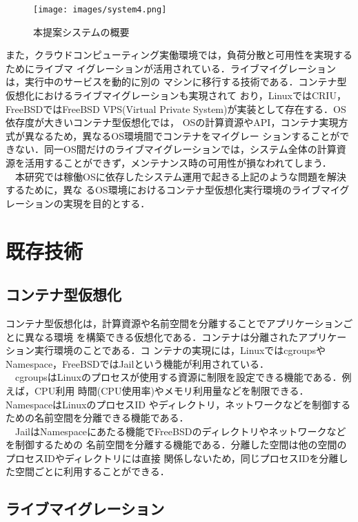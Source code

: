 \documentclass[11pt]{jarticle}
\begin{document}
\begin{figure*}[t]
  \centering
  \texttt{[image: images/system4.png]} \\
  \caption{本提案システムの概要}
  \label{fig:system}
\end{figure*}

また，クラウドコンピューティング実働環境では，負荷分散と可用性を実現するためにライブマ
イグレーションが活用されている．ライブマイグレーションは，実行中のサービスを動的に別の
マシンに移行する技術である．コンテナ型仮想化におけるライブマイグレーションも実現されて
おり，LinuxではCRIU\cite{criu}，FreeBSDではFreeBSD VPS(Virtual Private
 System)\cite{freebsd-vps}が実装として存在する．OS依存度が大きいコンテナ型仮想化では，
 OSの計算資源やAPI，コンテナ実現方式が異なるため，異なるOS環境間でコンテナをマイグレー
 ションすることができない．同一OS間だけのライブマイグレーションでは，システム全体の計算資
 源を活用することができず，メンテナンス時の可用性が損なわれてしまう．\\
　本研究では稼働OSに依存したシステム運用で起きる上記のような問題を解決するために，異な
るOS環境におけるコンテナ型仮想化実行環境のライブマイグレーションの実現を目的とする．

\section{既存技術}
\subsection{コンテナ型仮想化}
\label{sec:container}

コンテナ型仮想化は，計算資源や名前空間を分離することでアプリケーションごとに異なる環境
を構築できる仮想化である．コンテナは分離されたアプリケーション実行環境のことである．コ
ンテナの実現には，LinuxではcgroupsやNamespace，FreeBSDではJailという機能が利用されている．\\
　cgroupsはLinuxのプロセスが使用する資源に制限を設定できる機能である．例えば，CPU利用
時間(CPU使用率)やメモリ利用量などを制限できる．NamespaceはLinuxのプロセスID
やディレクトリ，ネットワークなどを制御するための名前空間を分離できる機能である．\\
　JailはNamespaceにあたる機能でFreeBSDのディレクトリやネットワークなどを制御するための
名前空間を分離する機能である．分離した空間は他の空間のプロセスIDやディレクトリには直接
関係しないため，同じプロセスIDを分離した空間ごとに利用することができる．

\subsection{ライブマイグレーション}
\end{document}
